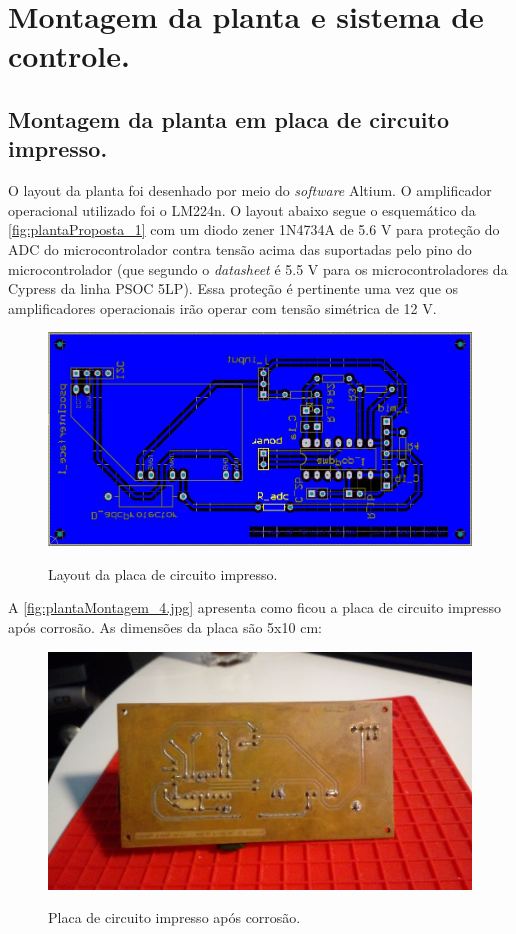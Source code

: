 \documentclass[
	article,			%
	11pt,				%
	oneside,			%
	a4paper,			%
	english,			%
	brazil,				%
	sumario=tradicional
	]{abntex2}
\begin{document}
\pagebreak



\section{\textbf{Montagem da planta e sistema de controle.}}

\subsection{Montagem da planta em placa de circuito impresso.}
 
O layout da planta foi desenhado por meio do \textit{software} Altium. O amplificador operacional utilizado foi o LM224n. O layout abaixo segue o esquemático da \autoref{fig:plantaProposta_1} com um diodo zener 1N4734A de 5.6 V para proteção do ADC do microcontrolador contra tensão acima das suportadas pelo pino do microcontrolador (que segundo o \textit{datasheet} é 5.5 V para os microcontroladores da Cypress da linha PSOC 5LP).
Essa proteção é pertinente uma vez que os amplificadores operacionais irão operar com tensão simétrica de 12 V. 

\begin{figure}[htb!]
	\centering
	\caption{Layout da placa de circuito impresso.}
	\includegraphics[scale=0.5]{./img/layout.JPG}
	\label{fig:layout}
\end{figure}

A \autoref{fig:plantaMontagem_4.jpg} apresenta como ficou a placa de circuito impresso após corrosão. As dimensões da placa são 5x10 cm:

\begin{figure}[htb!]
	\centering
	\caption{Placa de circuito impresso após corrosão.}
	\includegraphics[scale=0.23]{./img/plantaMontagem_4.jpg}
	\label{fig:plantaMontagem_4.jpg}
\end{figure}
\end{document}
